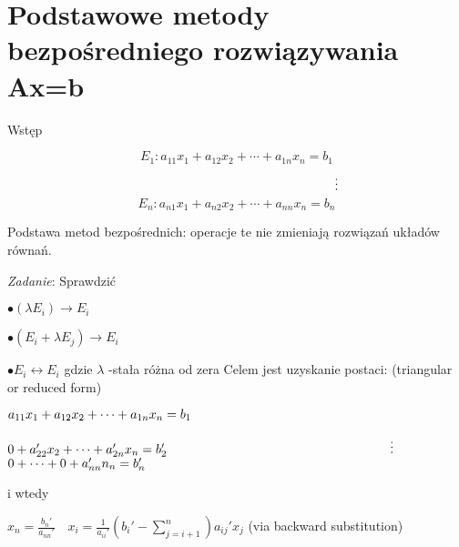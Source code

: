 \section{Podstawowe metody bezpośredniego rozwiązywania Ax=b}
	\begin{frame}{Wstęp}
\begin{exampleblock}{}
    $$
E_{1}:a_{11}x_{1}+a_{12}x_{2}+\cdots+a_{1n}x_{n}=b_{1}
$$
$$
\hspace{55.5mm} \vdots
$$
$$
E_{n}:a_{n1}x_{1}+a_{n2}x_{2}+\cdots+a_{nn}x_{n}=b_{n}
$$

 \end{exampleblock}
Podstawa metod bezpośrednich: operacje te nie zmieniają rozwiązań układów równań.
\begin{flushright}
{\it Zadanie}: Sprawdzić
\end{flushright} 
	\end{frame}
    \begin{frame}{}
    $\bullet(\lambda E_{i})\rightarrow E_{i}$

$\bullet(E_{i}+\lambda E_{j})\rightarrow E_{i}$

$\bullet E_{i}\leftrightarrow E_{i}$ \newline
gdzie $\lambda$ -stała różna od zera \newline
Celem jest uzyskanie postaci: (triangular or reduced form)
\begin{flushright}
$a_{11}x_{1}+a_{12}x_{2}+\cdots+a_{1n}x_{n}=b_{1} \linebreak$

$0+a_{22}'x_{2}+\cdots+a_{2n}'x_{n}=b_{2}'
 \linebreak$
$ \hspace{60mm} \vdots \linebreak$
$0+\cdots+0+a_{nn}'n_{n}=b_{n}' \linebreak$
\end{flushright}
$\mathrm{i}$ wtedy

$ x_{n}=  \frac{b_{n}'}{a_{nn}'}\quad x_{i}= \frac{1}{a_{ii}'}(b_{i}'-\displaystyle \sum_{j=i+1}^{n})a_{ij}'x_{j}$ (via backward substitution)
    \end{frame}

